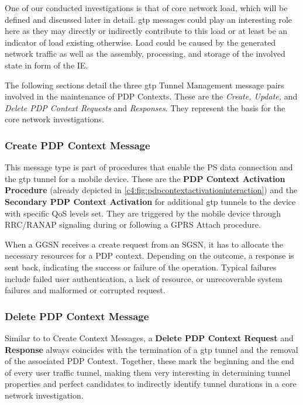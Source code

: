 One of our conducted investigations is that of core network load, which will be defined and discussed later in detail. \gls{gtp} messages could play an interesting role here as they may directly or indirectly contribute to this load or at least be an indicator of load existing otherwise. Load could be caused by the generated network traffic as well as the assembly, processing, and storage of the involved state in form of the \gls{IE}.

The following sections detail the three \gls{gtp} Tunnel Management message pairs involved in the maintenance of \gls{PDP} Contexts. These are the \textit{Create, Update,} and \textit{Delete \gls{PDP} Context Requests} and \textit{Responses}. They represent the basis for the core network investigations.


\subsubsection{Create PDP Context Message}

This message type is part of procedures that enable the \gls{PS} data connection and the \gls{gtp} tunnel for a mobile device. These are the \textbf{\gls{PDP} Context Activation Procedure} (already depicted in \ref{c4:fig:pdpcontextactivationinteraction}) and the \textbf{Secondary \gls{PDP} Context Activation} for additional \gls{gtp} tunnels to the device with specific \gls{QoS} levels set.  They are triggered by the mobile device through \gls{RRC}/\gls{RANAP} signaling during or following a \gls{GPRS} Attach procedure.

When a \gls{GGSN} receives a create request from an \gls{SGSN}, it has to allocate the necessary resources for a \gls{PDP} context. Depending on the outcome, a response is sent back, indicating the success or failure of the operation. Typical failures include failed user authentication, a lack of resource, or unrecoverable system failures and malformed or corrupted request.


\subsubsection{Delete PDP Context Message}

Similar to to Create Context Messages, a \textbf{Delete \gls{PDP} Context Request} and \textbf{Response} always coincides with the termination of a \gls{gtp} tunnel and the removal of the associated \gls{PDP} Context. Together, these mark the beginning and the end of every user traffic tunnel, making them very interesting in determining tunnel properties and perfect candidates to indirectly identify tunnel durations in a core network investigation.


